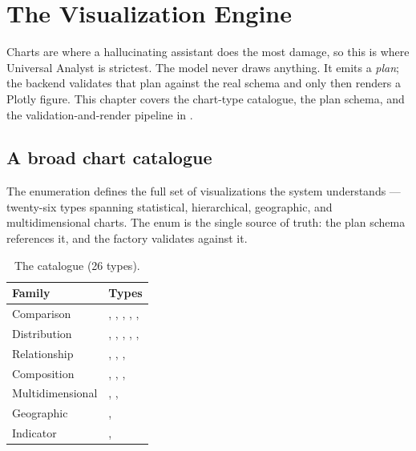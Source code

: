 \chapter{The Visualization Engine}
\label{ch:viz}

Charts are where a hallucinating assistant does the most damage, so this is
where Universal Analyst is strictest. The model never draws anything. It emits a
\emph{plan}; the backend validates that plan against the real schema and only
then renders a Plotly figure. This chapter covers the chart-type catalogue, the
plan schema, and the validation-and-render pipeline in .

\section{A broad chart catalogue}
The  enumeration defines the full set of visualizations the
system understands --- twenty-six types spanning statistical, hierarchical,
geographic, and multidimensional charts. The enum is the single source of truth:
the plan schema references it, and the factory validates against it.

\begin{table}[h]
\centering
\caption{The  catalogue (26 types).}
\small
\begin{tabularx}{\linewidth}{@{}L{2.6cm} X@{}}
\toprule
\textbf{Family} & \textbf{Types} \\
\midrule
Comparison & , , , ,
,  \\
Distribution & , , , ,
,  \\
Relationship & , , ,
 \\
Composition & , , ,  \\
Multidimensional & , ,
 \\
Geographic & ,  \\
Indicator & ,  \\
\bottomrule
\end{tabularx}
\end{table}

